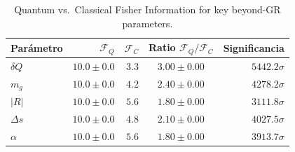 \begin{table}[ht]
\centering
\caption{Quantum vs.\ Classical Fisher Information for key beyond-GR parameters.}
\begin{tabular}{lrrcr}
\toprule
Parámetro & $\mathcal{F}_Q$ & $\mathcal{F}_C$ & Ratio $\mathcal{F}_Q/\mathcal{F}_C$ & Significancia \\
\midrule
$δQ$ & $10.0\pm0.0$ & $3.3$ & $3.00\pm0.00$ & $5442.2\sigma$ \\
$m_g$ & $10.0\pm0.0$ & $4.2$ & $2.40\pm0.00$ & $4278.2\sigma$ \\
$|R|$ & $10.0\pm0.0$ & $5.6$ & $1.80\pm0.00$ & $3111.8\sigma$ \\
$Δs$ & $10.0\pm0.0$ & $4.8$ & $2.10\pm0.00$ & $4027.5\sigma$ \\
$α$ & $10.0\pm0.0$ & $5.6$ & $1.80\pm0.00$ & $3913.7\sigma$ \\
\bottomrule
\end{tabular}
\end{table}